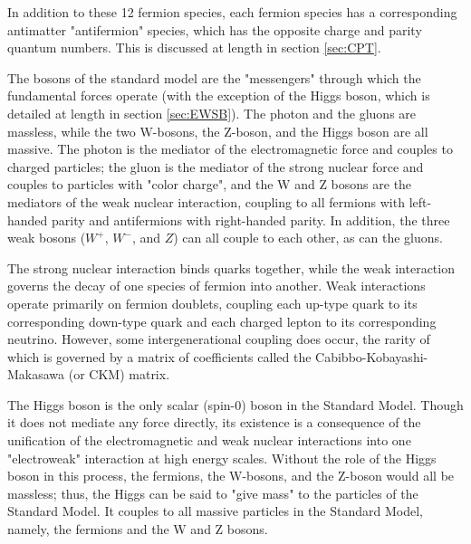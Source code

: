 In addition to these 12 fermion species, each fermion species has a corresponding antimatter "antifermion" species, which has the opposite charge and parity quantum numbers. This is discussed at length in section \ref{sec:CPT}.

The bosons of the standard model are the "messengers" through which the fundamental forces operate (with the exception of the Higgs boson, which is detailed at length in section \ref{sec:EWSB}). The photon and the gluons are massless, while the two W-bosons, the Z-boson, and the Higgs boson are all massive. The photon is the mediator of the electromagnetic force and couples to charged particles; the gluon is the mediator of the strong nuclear force and couples to particles with "color charge", and the W and Z bosons are the mediators of the weak nuclear interaction, coupling to all fermions with left-handed parity and antifermions with right-handed parity. In addition, the three weak bosons ($W^{+}$, $W^{-}$, and $Z$) can all couple to each other, as can the gluons.

The strong nuclear interaction binds quarks together, while the weak interaction governs the decay of one species of fermion into another. Weak interactions operate primarily on fermion doublets, coupling each up-type quark to its corresponding down-type quark and each charged lepton to its corresponding neutrino. However, some intergenerational coupling does occur, the rarity of which is governed by a matrix of coefficients called the Cabibbo-Kobayashi-Makasawa (or CKM) matrix. 

The Higgs boson is the only scalar (spin-0) boson in the Standard Model. Though it does not mediate any force directly, its existence is a consequence of the unification of the electromagnetic and weak nuclear interactions into one "electroweak" interaction at high energy scales. Without the role of the Higgs boson in this process, the fermions, the W-bosons, and the Z-boson would all be massless; thus, the Higgs can be said to "give mass" to the particles of the Standard Model. It couples to all massive particles in the Standard Model, namely, the fermions and the W and Z bosons.

